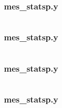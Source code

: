 \documentclass[a4paper]{article}
\theoremstyle{definition}
\theoremstyle{remark}
\newcommand{\python}[1]{\inputminted[linenos,frame=single]{python}{#1}}
\begin{document}
\part{}
\part{}

\appendix
\section{mes\_statsp.y}
\python{mes_stats.py}
\section{mes\_statsp.y}
\python{mes_stats.py}
\section{mes\_statsp.y}
\python{mes_stats.py}
\section{mes\_statsp.y}
\python{mes_stats.py}
\end{document}
